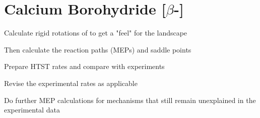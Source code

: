 \section{Calcium Borohydride [$\beta$-]}
\label{sec:borohydrides-calcium}

\ben
\item Calculate rigid rotations of  to get a "feel" for the landscape
\item Then calculate the reaction paths (MEPs) and saddle points
\item Prepare HTST rates and compare with experiments
\item Revise the experimental rates as applicable
\item Do further MEP calculations for mechanisms that still remain unexplained in the experimental data
\een

\placeholder
